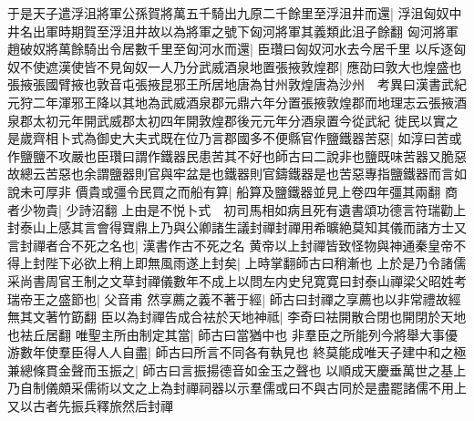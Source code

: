 于是天子遣浮沮將軍公孫賀將萬五千騎出九原二千餘里至浮沮井而還|{
	浮沮匈奴中井名出軍時期賀至浮沮井故以為將軍之號下匈河將軍其義類此沮子餘翻}
匈河將軍趙破奴將萬餘騎出令居數千里至匈河水而還|{
	臣瓚曰匈奴河水去今居千里}
以斥逐匈奴不使遮漢使皆不見匈奴一人乃分武威酒泉地置張掖敦煌郡|{
	應劭曰敦大也煌盛也張掖張國臂掖也敦音屯張掖昆邪王所居地唐為甘州敦煌唐為沙州　考異曰漢書武紀元狩二年渾邪王降以其地為武威酒泉郡元鼎六年分置張掖敦煌郡而地理志云張掖酒泉郡太初元年開武威郡太初四年開敦煌郡後元元年分酒泉置今從武紀}
徙民以實之　是歲齊相卜式為御史大夫式既在位乃言郡國多不便縣官作鹽鐵器苦惡|{
	如淳曰苦或作鹽鹽不攻嚴也臣瓚曰謂作鐵器民患苦其不好也師古曰二說非也鹽既味苦器又脆惡故總云苦惡也余謂鹽器則官與牢盆是也鐵器則官鑄鐵器是也苦惡專指鹽鐵器而言如說未可厚非}
價貴或彊令民買之而船有算|{
	船算及鹽鐵器並見上卷四年彊其兩翻}
商者少物貴|{
	少詩沼翻}
上由是不悦卜式　初司馬相如病且死有遺書頌功德言符瑞勸上封泰山上感其言會得寶鼎上乃與公卿諸生議封禪封禪用希曠絶莫知其儀而諸方士又言封禪者合不死之名也|{
	漢書作古不死之名}
黄帝以上封禪皆致怪物與神通秦皇帝不得上封陛下必欲上稍上即無風雨遂上封矣|{
	上時掌翻師古曰稍漸也}
上於是乃令諸儒采尚書周官王制之文草封禪儀數年不成上以問左内史兒寛寛曰封泰山禪梁父昭姓考瑞帝王之盛節也|{
	父音甫}
然享薦之義不著于經|{
	師古曰封禪之享薦也以非常禮故經無其文著竹筯翻}
臣以為封禪告成合袪於天地神祗|{
	李奇曰袪開散合閉也開閉於天地也袪丘居翻}
唯聖主所由制定其當|{
	師古曰當猶中也}
非羣臣之所能列今將舉大事優游數年使羣臣得人人自盡|{
	師古曰所言不同各有執見也}
終莫能成唯天子建中和之極兼總條貫金聲而玉振之|{
	師古曰言振揚德音如金玉之聲也}
以順成天慶垂萬世之基上乃自制儀頗采儒術以文之上為封禪祠器以示羣儒或曰不與古同於是盡罷諸儒不用上又以古者先振兵釋旅然后封禪

